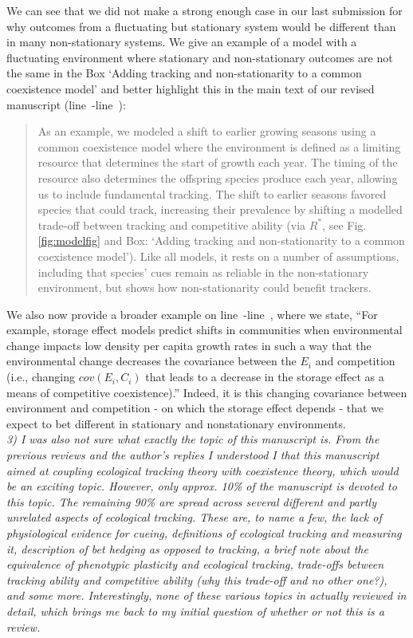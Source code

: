 \documentclass[11pt]{article}
\newcommand{\lr}[1]{line~\lineref{#1}}
\begin{document}
 We can see that we did not make a strong enough case in our last submission for why outcomes from a fluctuating but stationary system would be different than in many non-stationary systems. We give an example of a model with a fluctuating environment where stationary and non-stationary outcomes are not the same in the Box `Adding tracking and non-stationarity to a common coexistence model' and better highlight this in the main text of our revised manuscript (\lr{r1dS1}-\lr{r1dE1}):
\begin{quote}
As an example, we modeled a shift to earlier growing seasons using a common coexistence model where the environment is defined as a limiting resource that determines the start of growth each year. The timing of the resource also determines the offspring species produce each year, allowing us to include fundamental tracking. The shift to earlier seasons favored species that could track, increasing their prevalence by shifting a modelled trade-off between tracking and competitive ability (via $R^*$, see Fig. \ref{fig:modelfig} and Box: `Adding tracking and non-stationarity to a common coexistence model'). Like all models, it rests on a number of assumptions, including that species' cues remain as reliable in the non-stationary environment, but shows how non-stationarity could benefit trackers.
\end{quote}
We also now provide a broader example on \lr{r1dS}-\lr{r1dE}, where we state, ``For example, storage effect models predict shifts in communities when environmental change impacts low density per capita growth rates in such a way that the environmental change decreases the covariance between the $E_i$ and competition (i.e., changing $cov(E_i, C_i)$ that leads to a decrease in the storage effect as a means of competitive coexistence).'' Indeed, it is this changing covariance between environment and competition - on which the storage effect depends - that we expect to bet different in stationary and nonstationary environments. \\

\emph{3) I was also not sure what exactly the topic of this manuscript is. From the previous
reviews and the author's replies I understood I that this manuscript aimed at coupling
ecological tracking theory with coexistence theory, which would be an exciting topic.
However, only approx. 10\% of the manuscript is devoted to this topic. The remaining 90\% are
spread across several different and partly unrelated aspects of ecological tracking. These
are, to name a few, the lack of physiological evidence for cueing, definitions of ecological
tracking and measuring it, description of bet hedging as opposed to tracking, a brief note
about the equivalence of phenotypic plasticity and ecological tracking, trade-offs between
tracking ability and competitive ability (why this trade-off and no other one?), and some
more. Interestingly, none of these various topics in actually reviewed in detail, which
brings me back to my initial question of whether or not this is a review.}\\
\end{document}
